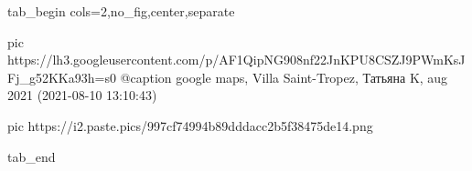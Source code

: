  
 
 
 
 


\ifcmt
  tab_begin cols=2,no_fig,center,separate

     pic https://lh3.googleusercontent.com/p/AF1QipNG908nf22JnKPU8CSZJ9PWmKsJFj_g52KKa93h=s0
		 @caption google maps, Villa Saint-Tropez, Татьяна K, aug 2021 (2021-08-10 13:10:43)

		 pic https://i2.paste.pics/997cf74994b89dddacc2b5f38475de14.png

  tab_end
\fi

